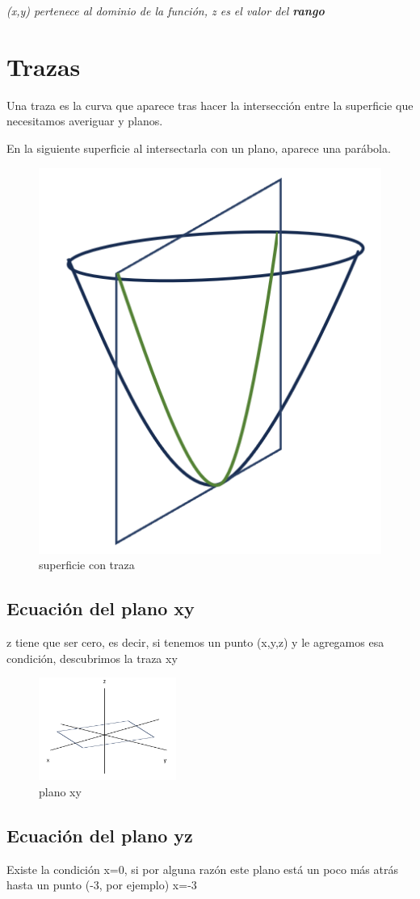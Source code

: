 \documentclass[letterpaper,12pt]{article}
\begin{document}
\begin{sloppypar}
\hspace{0.5cm}\textit{(x,y) pertenece al dominio de la función, z es el valor del \textbf{rango}}

\break \section{Trazas}
Una traza es la curva que aparece tras hacer la intersección entre la superficie que necesitamos averiguar y planos. 

En la siguiente superficie al intersectarla con un plano, aparece una parábola.

\begin{figure}[H]
    \centering
    \includegraphics[width=0.4\linewidth]{images/trazas.png}
    \caption{superficie con traza}
\end{figure}

\subsection{\textbf{Ecuación del plano xy}}

z tiene que ser cero, es decir, si tenemos un punto (x,y,z) y le agregamos esa condición, descubrimos la traza xy

\begin{figure}[H]
    \centering
    \includegraphics[width=0.4\textwidth]{images/plano xy.png}
    \caption{plano xy}
\end{figure}

\break \subsection{\textbf{Ecuación del plano yz}}
Existe la condición x=0, si por alguna razón este plano está un poco más atrás hasta un punto (-3, por ejemplo) x=-3


\end{sloppypar}
\end{document}
